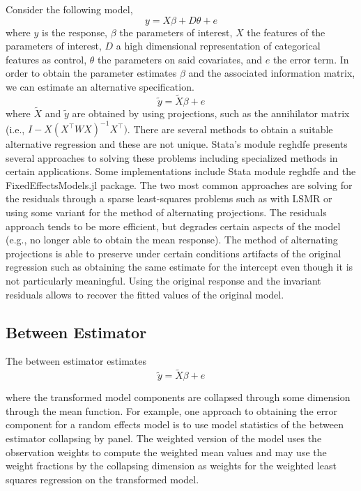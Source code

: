 \documentclass{juliacon}
\begin{document}
Consider the following model,
\begin{equation}
	y = X \beta + D \theta + e
\end{equation}
where $y$ is the response, $\beta$ the parameters of interest, $X$ the features of the parameters of interest, $D$ a high dimensional representation of categorical features as control, $\theta$ the parameters on said covariates, and $e$ the error term. In order to obtain the parameter estimates $\beta$ and the associated information matrix, we can estimate an alternative specification.
\begin{equation}
	\tilde{y} = \tilde{X} \beta + e
\end{equation}
where $\tilde{X}$ and $\tilde{y}$ are obtained by using projections, such as the annihilator matrix (i.e., $I - X \left(X^{\top}W X\right)^{-1} X^{\top})$. There are several methods to obtain a suitable alternative regression and these are not unique. Stata's module reghdfe \cite{reghdfe} presents several approaches to solving these problems including specialized methods in certain applications. Some implementations include Stata module reghdfe and the FixedEffectsModels.jl \cite{FixedEffectModels.jl} package. The two most common approaches are solving for the residuals through a sparse least-squares problems such as with LSMR \cite{LSMR} or using some variant for the method of alternating projections. The residuals approach tends to be more efficient, but degrades certain aspects of the model (e.g., no longer able to obtain the mean response). The method of alternating projections is able to preserve under certain conditions artifacts of the original regression such as obtaining the same estimate for the intercept even though it is not particularly meaningful. Using the original response and the invariant residuals allows to recover the fitted values of the original model.

\subsection{Between Estimator}

The between estimator estimates
\begin{equation}
	\tilde{y} = \tilde{X} \beta + e
\end{equation}

where the transformed model components are collapsed through some dimension through the mean function. For example, one approach to obtaining the error component for a random effects model is to use model statistics of the between estimator collapsing by panel. The weighted version of the model uses the observation weights to compute the weighted mean values and may use the weight fractions by the collapsing dimension as weights for the weighted least squares regression on the transformed model.
\end{document}
